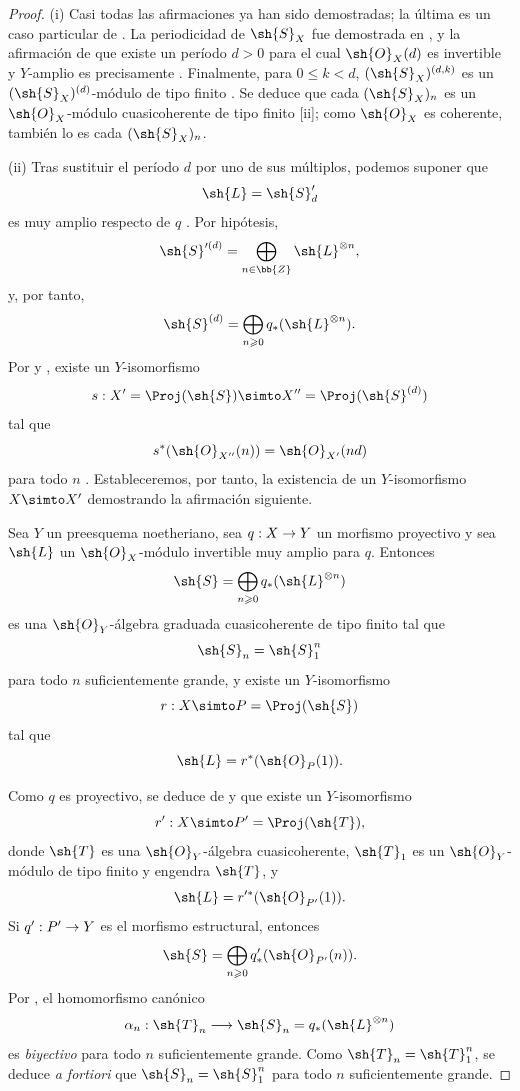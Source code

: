\documentclass[oneside]{amsart}
\makeatletter
\renewcommand{\leq}{\leqslant}
\renewcommand{\geq}{\geqslant}
\newcommand{\ega@arrow}[2]{\mathchoice{#1}{#2}{#2}{#2}}
\renewcommand{\to}{\ega@arrow{\longrightarrow}{\rightarrow}}
\newcommand{\oldpage}[2][]{{\marginnote{\normalfont\textbf{#1}~|~#2}}\ignorespaces}
\let\EGAOriginalLabel\label
\renewcommand{\label}[1]{\phantomsection\EGAOriginalLabel{#1}}
\makeatother
\begin{document}
\begin{proof}
(i) Casi todas las afirmaciones ya han sido demostradas; la última es un caso particular de .
La periodicidad de $\sh{S}_X$ fue demostrada en , y la afirmación de que existe un período $d>0$ para el cual $\sh{O}_X(d)$ es invertible y $Y$-amplio es precisamente .
Finalmente, para $0\leq k<d$, $(\sh{S}_X)^{(d,k)}$ es un $(\sh{S}_X)^{(d)}$-módulo de tipo finito .
Se deduce que cada $(\sh{S}_X)_n$ es un $\sh{O}_X$-módulo cuasicoherente de tipo finito [ii]; como $\sh{O}_X$ es coherente, también lo es cada $(\sh{S}_X)_n$.

(ii) Tras sustituir el período $d$ por uno de sus múltiplos, podemos suponer que
\[
  \sh{L}=\sh{S}'_d
\]
es muy amplio respecto de $q$ .
Por hipótesis,
\[
  \sh{S}'^{(d)}
  =\bigoplus_{n\in\bb{Z}}\sh{L}^{\otimes n},
\]
y, por tanto,
\[
  \sh{S}^{(d)}
  =\bigoplus_{n\geq0}q_*(\sh{L}^{\otimes n}).
\]
Por  y , existe un $Y$-isomorfismo
\[
  s:X'=\Proj(\sh{S})\simto
  X''=\Proj(\sh{S}^{(d)})
\]
tal que
\oldpage[III]{105}
\[
  s^*(\sh{O}_{X''}(n))=\sh{O}_{X'}(nd)
\]
para todo $n$ .
Estableceremos, por tanto, la existencia de un $Y$-isomorfismo $X\simto X'$ demostrando la afirmación siguiente.

\begin{proposition}[2.3.4.1]
\label{III.2.3.4.1}
Sea $Y$ un preesquema noetheriano, sea $q:X\to Y$ un morfismo proyectivo y sea $\sh{L}$ un $\sh{O}_X$-módulo invertible muy amplio para $q$.
Entonces
\[
  \sh{S}=\bigoplus_{n\geq0}q_*(\sh{L}^{\otimes n})
\]
es una $\sh{O}_Y$-álgebra graduada cuasicoherente de tipo finito tal que
\[
  \sh{S}_n=\sh{S}_1^n
\]
para todo $n$ suficientemente grande, y existe un $Y$-isomorfismo
\[
  r:X\simto P=\Proj(\sh{S})
\]
tal que
\[
  \sh{L}=r^*(\sh{O}_P(1)).
\]
\end{proposition}

Como $q$ es proyectivo, se deduce de  y  que existe un $Y$-isomorfismo
\[
  r':X\simto P'=\Proj(\sh{T}),
\]
donde $\sh{T}$ es una $\sh{O}_Y$-álgebra cuasicoherente, $\sh{T}_1$ es un $\sh{O}_Y$-módulo de tipo finito y engendra $\sh{T}$, y
\[
  \sh{L}=r'^*(\sh{O}_{P'}(1)).
\]
Si $q':P'\to Y$ es el morfismo estructural, entonces
\[
  \sh{S}=\bigoplus_{n\geq0}q'_*(\sh{O}_{P'}(n)).
\]
Por , el homomorfismo canónico
\[
  \alpha_n:\sh{T}_n\longrightarrow
  \sh{S}_n=q_*(\sh{L}^{\otimes n})
\]
es \emph{biyectivo} para todo $n$ suficientemente grande.
Como $\sh{T}_n=\sh{T}_1^n$, se deduce \emph{a fortiori} que $\sh{S}_n=\sh{S}_1^n$ para todo $n$ suficientemente grande.


\end{proof}
\end{document}
